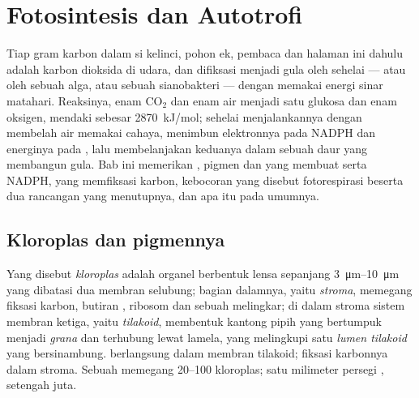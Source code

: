 \chapter{Fotosintesis dan Autotrofi}\label{ch:b1:photosynthesis}

Tiap gram karbon dalam si kelinci, pohon ek, pembaca dan halaman ini
dahulu adalah karbon dioksida di udara, dan difiksasi menjadi gula oleh
sehelai  --- atau oleh sebuah alga, atau sebuah sianobakteri ---
dengan memakai energi sinar matahari. Reaksinya, enam $\mathrm{CO_2}$
dan enam air menjadi satu glukosa dan enam oksigen, mendaki sebesar
\qty{2870}{kJ/mol}; sehelai  menjalankannya dengan membelah air
memakai cahaya, menimbun elektronnya pada NADPH dan energinya pada ,
lalu membelanjakan keduanya dalam sebuah daur yang membangun gula. Bab
ini memerikan , pigmen dan  yang membuat  serta
NADPH,  yang memfiksasi karbon, kebocoran yang disebut
fotorespirasi beserta dua rancangan yang menutupnya, dan apa itu
 pada umumnya.

\section{Kloroplas dan pigmennya}

\begin{definition}[Kloroplas]\label{def:b1:photosynthesis:chloroplast}
Yang disebut \emph{kloroplas} adalah organel berbentuk
lensa sepanjang \qtyrange{3}{10}{\micro m} yang dibatasi dua membran
selubung; bagian dalamnya, yaitu \emph{stroma}, memegang
 fiksasi karbon, butiran , ribosom dan sebuah  melingkar; di
dalam stroma sistem membran ketiga, yaitu
\emph{tilakoid}, membentuk kantong pipih yang bertumpuk
menjadi \emph{grana} dan terhubung lewat lamela, yang melingkupi satu
\emph{lumen tilakoid} yang bersinambung.  berlangsung
dalam membran tilakoid; fiksasi karbonnya dalam stroma. Sebuah  
memegang \qtyrange{20}{100}{} kloroplas; satu milimeter persegi ,
setengah juta.
\end{definition}

